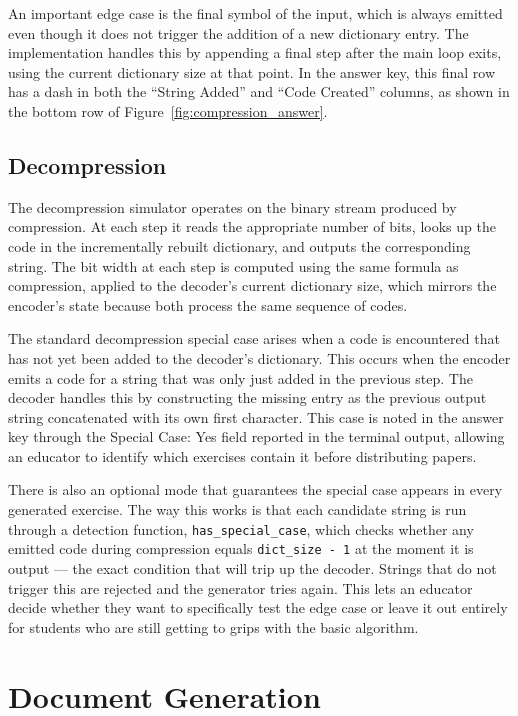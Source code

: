 \documentclass{l4proj}
\begin{document}
An important edge case is the final symbol of the input, which is always emitted even though it does not trigger the addition of a new dictionary entry. The implementation handles this by appending a final step after the main loop exits, using the current dictionary size at that point. In the answer key, this final row has a dash in both the ``String Added'' and ``Code Created'' columns, as shown in the bottom row of Figure~\ref{fig:compression_answer}.

\subsection{Decompression}

The decompression simulator operates on the binary stream produced by compression. At each step it reads the appropriate number of bits, looks up the code in the incrementally rebuilt dictionary, and outputs the corresponding string. The bit width at each step is computed using the same formula as compression, applied to the decoder's current dictionary size, which mirrors the encoder's state because both process the same sequence of codes.

The standard decompression special case arises when a code is encountered that has not yet been added to the decoder's dictionary. This occurs when the encoder emits a code for a string that was only just added in the previous step. The decoder handles this by constructing the missing entry as the previous output string concatenated with its own first character. This case is noted in the answer key through the Special Case: Yes field reported in the terminal output, allowing an educator to identify which exercises contain it before distributing papers.

There is also an optional mode that guarantees the special case appears in every generated exercise. The way this works is that each candidate string is run through a detection function, \texttt{has\_special\_case}, which checks whether any emitted code during compression equals \texttt{dict\_size - 1} at the moment it is output — the exact condition that will trip up the decoder. Strings that do not trigger this are rejected and the generator tries again. This lets an educator decide whether they want to specifically test the edge case or leave it out entirely for students who are still getting to grips with the basic algorithm.

\section{Document Generation}
\end{document}
